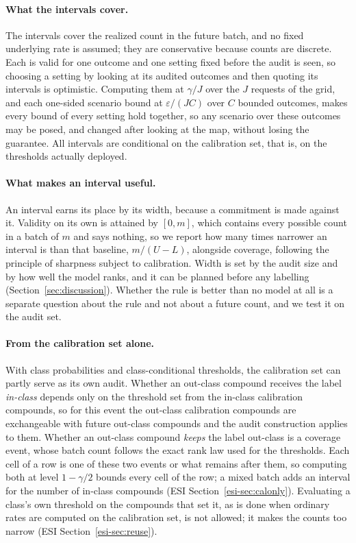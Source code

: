 \documentclass[twocolumn,10pt]{article}
\begin{document}
\paragraph{What the intervals cover.} The intervals cover the realized count in the future batch,
and no fixed underlying rate is assumed; they are conservative because counts are discrete. Each
is valid for one outcome and one setting fixed before the audit is seen, so choosing a setting by
looking at its audited outcomes and then quoting its intervals is optimistic. Computing them at
$\gamma/J$ over the $J$ requests of the grid, and each one-sided scenario bound at
$\varepsilon/(JC)$ over $C$ bounded outcomes, makes every bound of every setting hold together, so any scenario over these outcomes may be posed, and changed after looking at the map, without
losing the guarantee. All intervals are conditional on the calibration set, that is, on the
thresholds actually deployed.

\paragraph{What makes an interval useful.} An interval earns its place by its width, because a commitment is made against it. Validity on its own is attained by $[0,m]$, which contains every possible count in a batch of $m$ and says nothing, so we report how many times narrower an interval is than that baseline, $m/(U-L)$, alongside coverage, following the principle of sharpness subject to calibration.\citep{Gneiting2007Sharpness} Width is set by the audit size and by how well the model ranks, and it can be planned before any labelling (Section~\ref{sec:discussion}). Whether the rule is better than no model at all is a separate question about the rule and not about a future count, and we test it on the audit set.

\paragraph{From the calibration set alone.} With class probabilities and class-conditional thresholds, the calibration set can partly serve as its own audit. Whether an out-class compound receives the label \emph{in-class} depends only on the threshold set from the in-class calibration compounds, so for this event the out-class calibration compounds are exchangeable with future out-class compounds and the audit construction applies to them. Whether an out-class compound \emph{keeps} the label out-class is a coverage event, whose batch count follows the exact rank law used for the thresholds.\citep{Marques2025Beta} Each cell of a row is one of these two events or what remains after them, so computing both at level $1-\gamma/2$ bounds every cell of the row; a mixed batch adds an interval for the number of in-class compounds (ESI Section~\ref{esi-sec:calonly}). Evaluating a class's own threshold on the compounds that set it, as is done when ordinary rates are computed on the calibration set, is not allowed; it makes the counts too narrow (ESI Section~\ref{esi-sec:reuse}).
\end{document}
